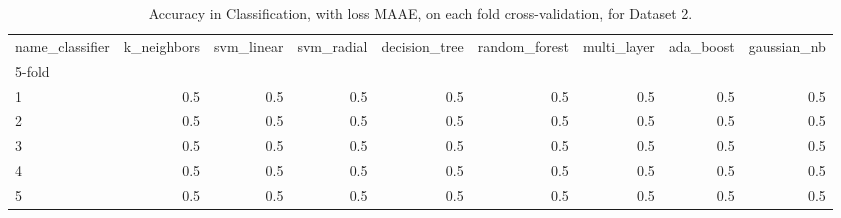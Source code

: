 \begin{table}
\centering
\caption{Accuracy in Classification, with loss MAAE, on each fold cross-validation, for Dataset 2.}
\label{table:acc-maae-chbmit-fold-2}
\begin{tabular}{lrrrrrrrr}
\toprule
name\_classifier &  k\_neighbors &  svm\_linear &  svm\_radial &  decision\_tree &  random\_forest &  multi\_layer &  ada\_boost &  gaussian\_nb \\
5-fold &              &             &             &                &                &              &            &              \\
\midrule
1      &          0.5 &         0.5 &         0.5 &            0.5 &            0.5 &          0.5 &        0.5 &          0.5 \\
2      &          0.5 &         0.5 &         0.5 &            0.5 &            0.5 &          0.5 &        0.5 &          0.5 \\
3      &          0.5 &         0.5 &         0.5 &            0.5 &            0.5 &          0.5 &        0.5 &          0.5 \\
4      &          0.5 &         0.5 &         0.5 &            0.5 &            0.5 &          0.5 &        0.5 &          0.5 \\
5      &          0.5 &         0.5 &         0.5 &            0.5 &            0.5 &          0.5 &        0.5 &          0.5 \\
\bottomrule
\end{tabular}
\end{table}
